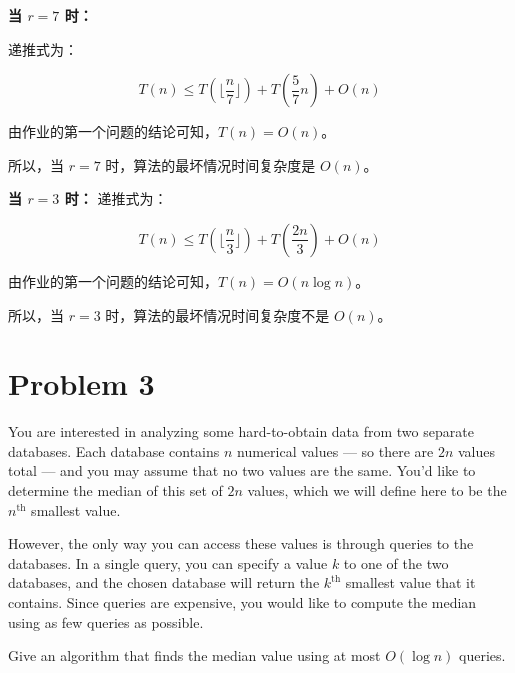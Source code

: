 ﻿\documentclass[12pt,a4paper]{article}
\begin{document}
\begin{answerbox}
\textbf{当 $r = 7$ 时：}

递推式为：

$$
T(n) \leq T(\lfloor \frac{n}{7} \rfloor) + T\left(\frac{5}{7} n \right) + O(n)
$$

由作业的第一个问题的结论可知，$T(n) = O(n)$。

所以，当 $r=7$ 时，算法的最坏情况时间复杂度是 $O(n)$。

\textbf{当 $r = 3$ 时：}
递推式为：

$$
T(n) \leq T(\lfloor \frac{n}{3} \rfloor) + T\left(\frac{2n}{3} \right) + O(n)
$$

由作业的第一个问题的结论可知，$T(n) = O(n\log n)$。

所以，当 $r=3$ 时，算法的最坏情况时间复杂度不是 $O(n)$。

\end{answerbox}

\section{Problem 3}

You are interested in analyzing some hard-to-obtain data from two separate databases. Each database contains $n$ numerical values --- so there are $2n$ values total --- and you may assume that no two values are the same. You'd like to determine the median of this set of $2n$ values, which we will define here to be the $n^{\text{th}}$ smallest value.

However, the only way you can access these values is through queries to the databases. In a single query, you can specify a value $k$ to one of the two databases, and the chosen database will return the $k^{\text{th}}$ smallest value that it contains. Since queries are expensive, you would like to compute the median using as few queries as possible.

Give an algorithm that finds the median value using at most $O(\log n)$ queries.
\end{document}
